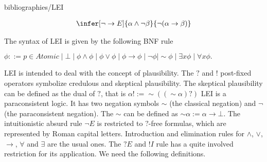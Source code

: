 \begin{entry}{bibliographies/LEI}
\begin{calculus}
\[\begin{array}{ccccccccccccccc}
  &
  \quad
  &
  
  
  \infer[\neg\to E]{\alpha \land \neg\beta}{\neg(\alpha \to \beta)}
  
  &
  \quad
  &
  
%  
%  
%  
  
  \end{array}
\]
\vspace{-1em}

\end{calculus}




\begin{clarifications}
  The syntax of LEI is given by the following BNF rule
  \begin{center} 
    \begin{math}
        \phi ::= p \in Atomic \mid \bot \mid \phi \land \phi \mid \phi \lor \phi \mid \phi \rightarrow \phi \mid \neg \phi \mid \sim \phi \mid \exists x\phi \mid \forall x\phi.
    \end{math}
  \end{center}
  
  LEI is intended to deal with the concept of plausibility. The $?$ and $!$ post-fixed operators symbolize credulous and skeptical plausibility. The skeptical plausibility can be defined as the dual of $?$, that is $\alpha ! := \sim ((\sim \alpha)?)$ LEI is a paraconsistent logic. It has two negation symbols $\sim$ (the classical negation) and $\neg$ (the paraconsistent negation). The $\sim$ can be defined as $\sim \alpha := \alpha \to \bot$. The intuitionistic absurd rule $\neg E$ is restricted to $?$-free formulas, which are represented by Roman capital letters. Introduction and elimination rules for $\land$, $\lor$, $\to$, $\forall$ and $\exists$ are the usual ones. The $?E$ and $!I$ rule has a quite involved restriction for its application. We need the following definitions.
  

\end{clarifications}
\end{entry}
